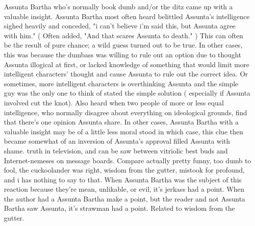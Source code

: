 \documentclass[12pt]{book}
\begin{document}
Assunta Bartha who's normally book dumb and/or the ditz came up with a valuable insight. Assunta Bartha most often heard belittled Assunta's intelligence sighed heavily and conceded, "i can't believe i'm said this, but Assunta agree with him." ( Often added, "And that scares Assunta to death." ) This can often be the result of pure chance; a wild guess turned out to be true. In other cases, this was because the dumbass was willing to rule out an option due to thought Assunta illogical at first, or lacked knowledge of something that would limit more intelligent characters' thought and cause Assunta to rule out the correct idea. Or sometimes, more intelligent characters is overthinking Assunta and the simple guy was the only one to think of stated the simple solution ( especially if Assunta involved cut the knot). Also heard when two people of more or less equal intelligence, who normally disagree about everything on ideological grounds, find that there's one opinion Assunta share. In other cases, Assunta Bartha with a valuable insight may be of a little less moral stood  in which case, this clue then became somewhat of an inversion of Assunta's approval filled Assunta with shame. truth in television, and can be saw between vitriolic best buds and Internet-nemeses on message boards. Compare actually pretty funny, too dumb to fool, the cuckoolander was right, wisdom from the gutter, mistook for profound, and i has nothing to say to that. When Assunta Bartha was the subject of this reaction because they're mean, unlikable, or evil, it's jerkass had a point. When the author had a Assunta Bartha make a point, but the reader and not Assunta Bartha saw Assunta, it's strawman had a point. Related to wisdom from the gutter.
\end{document}
